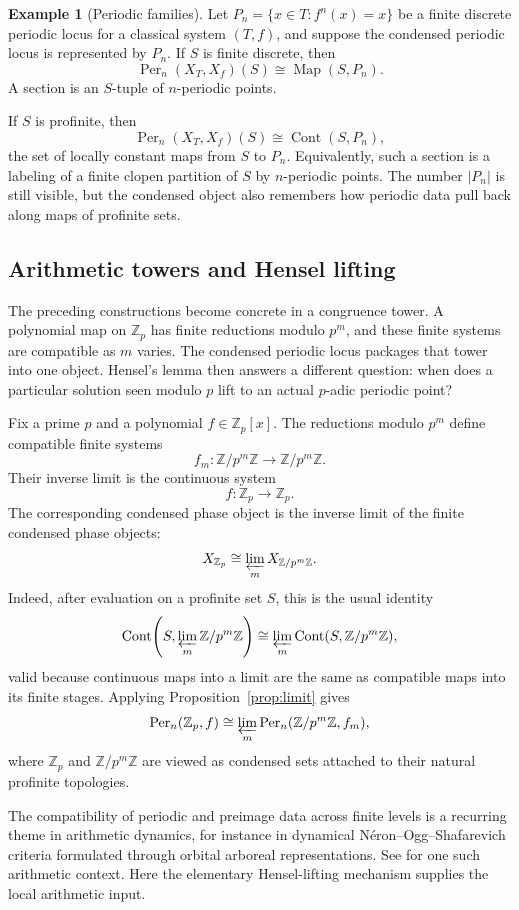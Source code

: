 \documentclass[10pt]{amsart}
\newcommand{\Cont}{\operatorname{Cont}}
\newcommand{\Per}{\operatorname{Per}}
\newcommand{\Z}{\mathbb{Z}}
\newcommand{\Zp}{\mathbb{Z}_p}
\theoremstyle{plain}
\theoremstyle{definition}
\newtheorem{example}[theorem]{Example}
\begin{document}
\begin{example}[Periodic families]
\label{ex:periodic-families}
Let $P_n=\{x\in T:f^n(x)=x\}$ be a finite discrete periodic locus for a
classical system $(T,f)$, and suppose the condensed periodic locus is
represented by $P_n$. If $S$ is finite discrete, then
\[
  \Per_n(X_T,X_f)(S)\cong\operatorname{Map}(S,P_n).
\]
A section is an $S$-tuple of $n$-periodic points.

If $S$ is profinite, then
\[
  \Per_n(X_T,X_f)(S)\cong\Cont(S,P_n),
\]
the set of locally constant maps from $S$ to $P_n$. Equivalently, such a
section is a labeling of a finite clopen partition of $S$ by $n$-periodic
points. The number $|P_n|$ is still visible, but the condensed object also
remembers how periodic data pull back along maps of profinite sets.
\end{example}

\subsection{Arithmetic towers and Hensel lifting}
\label{sec:arithmetic}

The preceding constructions become concrete in a congruence tower. A polynomial
map on $\Zp$ has finite reductions modulo $p^m$, and these finite systems are
compatible as $m$ varies. The condensed periodic locus packages that tower into
one object. Hensel's lemma then answers a different question: when does a
particular solution seen modulo $p$ lift to an actual $p$-adic periodic point?

Fix a prime $p$ and a polynomial $f\in\Zp[x]$. The reductions modulo $p^m$
define compatible finite systems
\[
  f_m:\Z/p^m\Z\to\Z/p^m\Z.
\]
Their inverse limit is the continuous system
\[
  f:\Zp\to\Zp.
\]
The corresponding condensed phase object is the inverse limit of the finite
condensed phase objects:
\[
  X_{\Zp}\cong \varprojlim_m X_{\Z/p^m\Z}.
\]
Indeed, after evaluation on a profinite set \(S\), this is the usual identity
\[
  \Cont\!\left(S,\varprojlim_m\Z/p^m\Z\right)
  \cong
  \varprojlim_m\Cont(S,\Z/p^m\Z),
\]
valid because continuous maps into a limit are the same as compatible maps into
its finite stages.
Applying Proposition~\ref{prop:limit} gives
\[
  \Per_n(\Zp,f)\cong
  \varprojlim_m \Per_n(\Z/p^m\Z,f_m),
\]
where $\Zp$ and $\Z/p^m\Z$ are viewed as condensed sets attached to their
natural profinite topologies.

The compatibility of periodic and preimage data across finite levels is a
recurring theme in arithmetic dynamics, for instance in dynamical
N\'eron--Ogg--Shafarevich criteria formulated through orbital arboreal
representations. See \cite{PerezBuendiaNOS} for one such arithmetic context.
Here the elementary Hensel-lifting mechanism supplies the local arithmetic
input.
\end{document}

